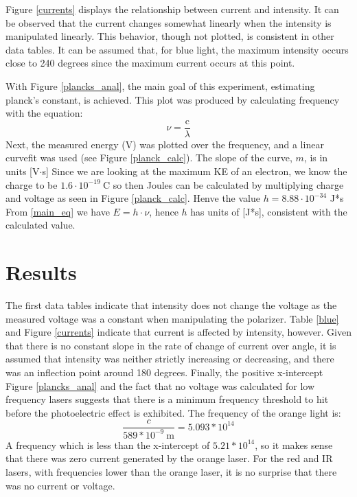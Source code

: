 \documentclass{article}[12pt]
\begin{document}
Figure \ref{currents} displays the relationship between current and intensity.
It can be observed that the current changes somewhat linearly when the intensity is manipulated linearly.
This behavior, though not plotted, is consistent in other data tables.
It can be assumed that, for blue light, the maximum intensity occurs close to 240 degrees since the maximum current occurs at this point. 

With Figure \ref{plancks_anal}, the main goal of this experiment, estimating planck's constant, is achieved.
This plot was produced by calculating frequency with the equation:
\begin{equation}
  \nu = \frac{\text{c}}{\lambda }
\end{equation}
Next, the measured energy (V) was plotted over the frequency, and a linear curvefit was used (see Figure \ref{planck_calc}).
The slope of the curve, $ m $, is in units [V$\cdot$s]
Since we are looking at the maximum KE of an electron, we know the charge to be $ 1.6 \cdot 10^{-19}~\text{C} $ so then Joules can be calculated by multiplying charge and voltage as seen in Figure \ref{planck_calc}.
Henve the value $ h = 8.88 \cdot 10^{-34} $ J*s
From \eqref{main_eq} we have $ E = h \cdot \nu  $, hence $ h $ has units of [J*s], consistent with the calculated value.


\section{Results}

The first data tables indicate that intensity does not change the voltage as the measured voltage was a constant when manipulating the polarizer.
Table \ref{blue} and Figure \ref{currents} indicate that current is affected by intensity, however.
Given that there is no constant slope in the rate of change of current over angle, it is assumed that intensity was neither strictly increasing or decreasing, and there was an inflection point around 180 degrees.
Finally, the positive x-intercept Figure \ref{plancks_anal} and the fact that no voltage was calculated for low frequency lasers suggests that there is a minimum frequency threshold to hit before the photoelectric effect is exhibited.
The frequency of the orange light is:
\begin{equation}
  \frac{c}{589*10^{-9}~\text{m}} = 5.093*10^{14}
\end{equation}
A frequency which is less than the x-intercept of $ 5.21*10^14 $, so it makes sense that there was zero current generated by the orange laser.
For the red and IR lasers, with frequencies lower than the orange laser, it is no surprise that there was no current or voltage.
\end{document}
